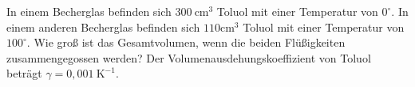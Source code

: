 \begin{Exercise}[label = volchange, title = Mischungsvolumen, difficulty = 2, origin = {II. IPhO, Ungarische Volksrepublik 1968}]
	In einem Becherglas befinden sich $300~\mathrm{cm^3}$ Toluol mit einer Temperatur von $0^{\circ}$. In einem anderen Becherglas befinden sich $110\mathrm{cm^3}$ Toluol mit einer Temperatur von $100^{\circ}$. Wie groß ist das Gesamtvolumen, wenn die beiden Flüßigkeiten zusammengegossen werden? Der Volumenausdehungskoeffizient von Toluol beträgt $\gamma = 0,001~\mathrm{K^{-1}}$.
\end{Exercise}